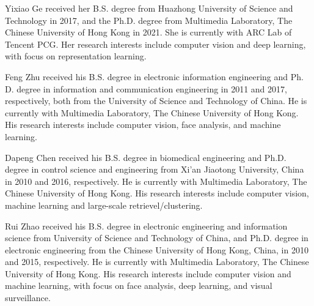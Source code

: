 \documentclass[journal]{IEEEtran}
\begin{document}
\ifCLASSOPTIONcaptionsoff
  \newpage
\fi
















\begin{IEEEbiography}{Yixiao Ge}
received her B.S. degree from Huazhong University of Science and Technology in 2017, and the Ph.D. degree from Multimedia Laboratory, The Chinese University of Hong Kong in 2021.
She is currently with ARC Lab of Tencent PCG.
Her research interests include computer vision and deep learning, with focus on representation learning.
\end{IEEEbiography}


\begin{IEEEbiography}{Feng Zhu}
received his B.S. degree in electronic information engineering and Ph. D. degree in information and communication engineering in 2011 and 2017, respectively, both from the University of Science and Technology of China.
He is currently with Multimedia Laboratory, The Chinese University of Hong Kong.
His research interests include computer vision, face analysis, and machine learning.
\end{IEEEbiography}


\begin{IEEEbiography}{Dapeng Chen}
received his B.S. degree in biomedical engineering and Ph.D. degree in control science and engineering from Xi'an Jiaotong University, China in 2010 and 2016, respectively.
He is currently with Multimedia Laboratory, The Chinese University of Hong Kong.
His research interests include computer vision, machine learning and large-scale retrievel/clustering.
\end{IEEEbiography}


\begin{IEEEbiography}{Rui Zhao}
received his B.S. degree in electronic engineering and information science from University of Science and Technology of China, and Ph.D. degree in electronic engineering from the Chinese University of Hong Kong, China, in 2010 and 2015, respectively.
He is currently with Multimedia Laboratory, The Chinese University of Hong Kong.
His research interests include computer vision and machine learning, with focus on face analysis, deep learning, and visual surveillance.
\end{IEEEbiography}
\end{document}
